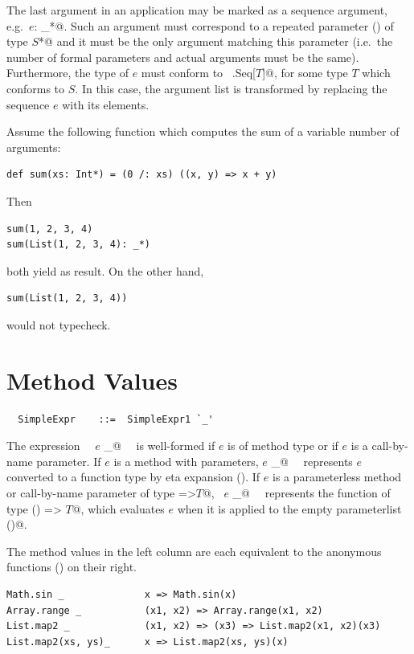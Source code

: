 The last argument in an application may be marked as a sequence
argument, e.g.\ \lstinline@$e$: _*@. Such an argument must correspond
to a repeated parameter () of type
\lstinline@$S$*@ and it must be the only argument matching this
parameter (i.e.\ the number of formal parameters and actual arguments
must be the same). Furthermore, the type of $e$ must conform to
~\lstinline@scala.Seq[$T$]@, for some type $T$ which conforms to
$S$. In this case, the argument list is transformed by replacing the
sequence $e$ with its elements.

\example Assume the following function which computes the sum of a
variable number of arguments:
\begin{lstlisting}
def sum(xs: Int*) = (0 /: xs) ((x, y) => x + y)
\end{lstlisting}
Then
\begin{lstlisting}
sum(1, 2, 3, 4)
sum(List(1, 2, 3, 4): _*)
\end{lstlisting}
both yield  as result. On the other hand, 
\begin{lstlisting}
sum(List(1, 2, 3, 4))
\end{lstlisting}
would not typecheck.

\section{Method Values}\label{sec:meth-vals}

\syntax\begin{lstlisting}
  SimpleExpr    ::=  SimpleExpr1 `_'
\end{lstlisting}

The expression ~~\lstinline@$e$ _@~~ is well-formed if $e$ is of method
type or if $e$ is a call-by-name parameter.  If $e$ is a method with
parameters, \lstinline@$e$ _@~~ represents $e$ converted to a function
type by eta expansion (). If $e$ is a
parameterless method or call-by-name parameter of type 
\lstinline@=>$T$@, ~\lstinline@$e$ _@~~ represents the function of type 
\lstinline@() => $T$@, which evaluates $e$ when it is applied to the empty
parameterlist \lstinline@()@. 

\example The method values in the left column are each equivalent to the 
anonymous functions () on their right.

\begin{lstlisting}
Math.sin _              x => Math.sin(x)
Array.range _           (x1, x2) => Array.range(x1, x2)
List.map2 _             (x1, x2) => (x3) => List.map2(x1, x2)(x3)
List.map2(xs, ys)_      x => List.map2(xs, ys)(x)
\end{lstlisting}

